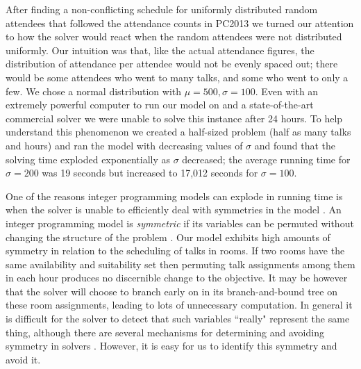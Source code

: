 \documentclass[]{article}
\theoremstyle{definition}
\theoremstyle{remark}
\numberwithin{equation}{section}
\begin{document}
After finding a non-conflicting schedule for uniformly distributed random attendees that followed the attendance counts in PC2013 we turned our attention to how the solver would react when the random attendees were not distributed uniformly. Our intuition was that, like the actual attendance figures, the distribution of attendance per attendee would not be evenly spaced out; there would be some attendees who went to many talks, and some who went to only a few. We chose a normal distribution with $\mu = 500, \sigma = 100$. Even with an extremely powerful computer to run our model on and a state-of-the-art commercial solver we were unable to solve this instance after 24 hours. To help understand this phenomenon we created a half-sized problem (half as many talks and hours) and ran the model with decreasing values of $\sigma$ and found that the solving time exploded exponentially as $\sigma$ decreased; the average running time for $\sigma = 200$ was 19 seconds but increased to 17,012 seconds for $\sigma = 100$.

One of the reasons integer programming models can explode in running time is when the solver is unable to efficiently deal with symmetries in the model \cite{sherali}. An integer programming model is \emph{symmetric} if its variables can be permuted without changing the structure of the problem \cite{margot}. Our model exhibits high amounts of symmetry in relation to the scheduling of talks in rooms. If two rooms have the same availability and suitability set then permuting talk assignments among them in each hour produces no discernible change to the objective. It may be however that the solver will choose to branch early on in its branch-and-bound tree on these room assignments, leading to lots of unnecessary computation. In general it is difficult for the solver to detect that such variables ``really" represent the same thing, although there are several mechanisms for  determining and avoiding symmetry in solvers \cite{ostrowski}. However, it is easy for us to identify this symmetry and avoid it.
\end{document}
